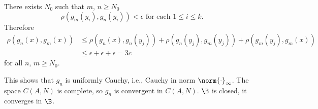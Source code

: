 There exists $N_0$ such that $m$, $n\geq N_0$
\[ \rho(g_m(y_i),g_n(y_i))<\epsilon \text{ for each $1\leq i\leq k$} . \]
Therefore
\begin{align*}
\rho(g_n(x),g_m(x)) &\leq \rho(g_n(x),g_n(y_j)) + \rho(g_n(y_j),g_m(y_j)) + \rho(g_m(y_j),g_m(x)) \\
&\leq \epsilon + \epsilon + \epsilon = 3c
\end{align*}
for all $n$, $m\geq N_0$.

This shows that $g_n$ is uniformly Cauchy, i.e., Cauchy in norm $\norm{\cdot}_\infty$.  The space $C(A,N)$ is complete, so $g_n$ is convergent in $C(A,N)$.  $\B$ is closed, it converges in $\B$.
